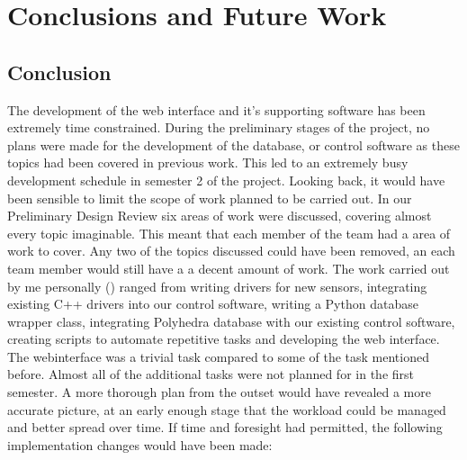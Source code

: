 \section{Conclusions and Future Work}

\subsection{Conclusion}
The development of the web interface and it's supporting software has been extremely time constrained. During the preliminary stages of the project, no plans were made for the development of the database, or control software as these topics had been covered in previous work. This led to an extremely busy development schedule in semester 2 of the project.
\newline
Looking back, it would have been sensible to limit the scope of work planned to be carried out. In our Preliminary Design Review \cite{tibby-lit-review} six areas of work were discussed, covering almost every topic imaginable. This meant that each member of the team had a area of work to cover. Any two of the topics discussed could have been removed, an each team member would still have a a decent amount of work.
\newline
The work carried out by me personally (\cameron) ranged from writing drivers for new sensors, integrating existing C++ drivers into our control software, writing a Python database wrapper class, integrating Polyhedra database with our existing control software, creating scripts to automate repetitive tasks and developing the web interface. The \gls{webinterface} was a trivial task compared to some of the task mentioned before. Almost all of the additional tasks were not planned for in the first semester. A more thorough plan from the outset would have revealed a more accurate picture, at an early enough stage that the workload could be managed and better spread over time.
\newline
If time and foresight had permitted, the following implementation changes would have been made:

